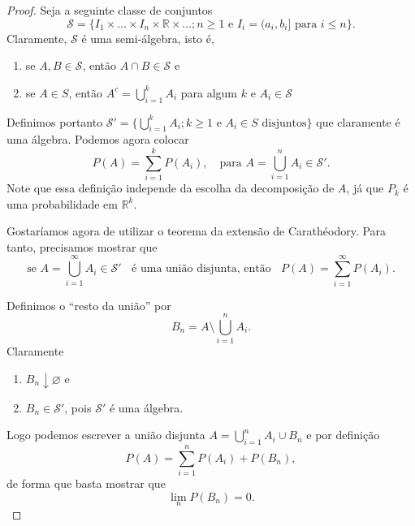 \documentclass[reqno]{article}
\newcommand*\1{\mathds{1}}
\newcommand{\mcup}{\textstyle \bigcup\limits}
\begin{document}
\begin{proof}
  Seja a seguinte classe de conjuntos
  \begin{equation}
    \mathcal{S} = \big\{I_1 \times \dots \times I_n \times \mathbb{R} \times \dots; n \geq 1 \text{ e } I_i = (a_i, b_i] \text{ para $i \leq n$} \big\}.
  \end{equation}
  Claramente, $\mathcal{S}$ é uma semi-álgebra, isto é,
  \begin{enumerate}
  \item se $A, B \in \mathcal{S}$, então $A \cap B \in \mathcal{S}$ e
  \item se $A \in S$, então $A^c = \bigcup_{i = 1}^k A_i$ para algum $k$ e $A_i \in \mathcal{S}$
  \end{enumerate}

  Definimos portanto $\mathcal{S}' = \big\{ \bigcup_{i=1}^k A_i; k \geq 1 \text{ e $A_i \in S$ disjuntos}\big\}$ que claramente é uma álgebra.
  Podemos agora colocar
  \begin{equation}
    P(A) = \sum_{i=1}^k P(A_i), \quad \text{para $A = \mcup_{i=1}^n A_i \in \mathcal{S}'$}.
  \end{equation}
  Note que essa definição independe da escolha da decomposição de $A$, já que $P_k$ é uma probabilidade em $\mathbb{R}^k$.

  Gostaríamos agora de utilizar o teorema da extensão de Carathéodory.
  Para tanto, precisamos mostrar que
  \begin{equation}
    \text{se $A = \mcup_{i=1}^\infty A_i \in \mathcal{S}' \;\;$ é uma união disjunta, então $\;\; \textstyle{P(A) = \sum\limits_{i=1}^\infty P(A_i)}$}.
  \end{equation}

  Definimos o ``resto da união'' por
  \begin{equation}
    B_n = A \setminus \mcup_{i=1}^n A_i.
  \end{equation}
  Claramente
  \begin{enumerate}
  \item $B_n \downarrow \varnothing$ e
  \item $B_n \in \mathcal{S}'$, pois $\mathcal{S}'$ é uma álgebra.
  \end{enumerate}

  Logo podemos escrever a união disjunta $A = \bigcup_{i=1}^n A_i \cup B_n$ e por definição
  \begin{equation}
    P(A) = \sum_{i=1}^n P(A_i) + P(B_n),
  \end{equation}
  de forma que basta mostrar que
  \begin{equation}
    \label{e:B_n_cont_vazio}
    \lim_n P(B_n) = 0.
  \end{equation}


\end{proof}
\end{document}

